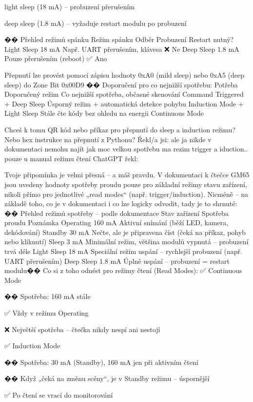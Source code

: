         light sleep (18 mA) – probuzení přerušením

        deep sleep (1.8 mA) – vyžaduje restart modulu po probuzení​

�� Přehled režimů spánku
Režim spánku	Odběr	Probuzení	Restart nutný?
Light Sleep	18 mA	Např. UART přerušením, klávesa	❌ Ne
Deep Sleep	1.8 mA	Pouze přerušením (reboot)	✅ Ano

Přepnutí lze provést pomocí zápisu hodnoty 0xA0 (mild sleep) nebo 0xA5 (deep sleep) do Zone Bit 0x00D9​
�� Doporučení pro co nejnižší spotřebu:
Potřeba	Doporučený režim
Co nejnižší spotřeba, občasné skenování	Command Triggered + Deep Sleep
Úsporný režim + automatická detekce pohybu	Induction Mode + Light Sleep
Stále čte kódy bez ohledu na energii	Continuous Mode

Chceš k tomu QR kód nebo příkaz pro přepnutí do sleep a induction režimu? Nebo hex instrukce na přepnutí z Pythonu?
Řekl/a jsi:
ale ja nikde v dokumentaci nemohu najít jak moc velkou spotřebu ma rezim trigger a iduction.. pouze u manual režimu čtení
ChatGPT řekl:

Tvoje připomínka je velmi přesná – a máš pravdu. V dokumentaci k čtečce GM65 jsou uvedeny hodnoty spotřeby proudu pouze pro základní režimy stavu zařízení, nikoli přímo pro jednotlivé „read modes“ (např. trigger/induction). Nicméně – na základě toho, co je v dokumentaci i co lze logicky odvodit, tady je to shrnuté:
�� Přehled režimů spotřeby – podle dokumentace​
Stav zařízení	Spotřeba proudu	Poznámka
Operating	160 mA	Aktivní snímání (běží LED, kamera, dekódování)
Standby	30 mA	Nečte, ale je připravena číst (čeká na příkaz, pohyb nebo kliknutí)
Sleep	3 mA	Minimální režim, většina modulů vypnutá – probuzení trvá déle
Light Sleep	18 mA	Speciální režim uspání – rychlejší probuzení (např. UART přerušením)
Deep Sleep	1.8 mA	Úplné uspání – probuzení = restart modulu​
�� Co si z toho odnést pro režimy čtení (Read Modes):
✅ Continuous Mode

    �� Spotřeba: 160 mA stále

    ✅ Vždy v režimu Operating

    ❌ Největší spotřeba – čtečka nikdy nespí ani nestojí

✅ Induction Mode

    �� Spotřeba: 30 mA (Standby), 160 mA jen při aktivním čtení

    �� Když „čeká na změnu scény“, je v Standby režimu – úspornější

    ✅ Po čtení se vrací do monitorování

